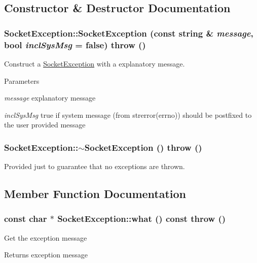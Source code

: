 \subsection{Constructor \& Destructor Documentation}
\hypertarget{classSocketException_abb5bcecd9d9e20868c237ec5a82cf5c3}{
\subsubsection[{SocketException}]{\setlength{\rightskip}{0pt plus 5cm}SocketException::SocketException (const string \& {\em message}, \/  bool {\em inclSysMsg} = {\ttfamily false})  throw ()}}
\label{classSocketException_abb5bcecd9d9e20868c237ec5a82cf5c3}
Construct a \hyperlink{classSocketException}{SocketException} with a explanatory message. 
\begin{DoxyParams}{Parameters}
\item[{\em message}]explanatory message \item[{\em inclSysMsg}]true if system message (from strerror(errno)) should be postfixed to the user provided message \end{DoxyParams}
\hypertarget{classSocketException_a659557c899329aea01977c980c4db9b9}{
\subsubsection[{$\sim$SocketException}]{\setlength{\rightskip}{0pt plus 5cm}SocketException::$\sim$SocketException ()  throw ()}}
\label{classSocketException_a659557c899329aea01977c980c4db9b9}
Provided just to guarantee that no exceptions are thrown. 

\subsection{Member Function Documentation}
\hypertarget{classSocketException_a06b7b3f186976bb5ec7e7bf007c4f0ac}{
\subsubsection[{what}]{\setlength{\rightskip}{0pt plus 5cm}const char $\ast$ SocketException::what () const  throw ()}}
\label{classSocketException_a06b7b3f186976bb5ec7e7bf007c4f0ac}
Get the exception message \begin{DoxyReturn}{Returns}
exception message 
\end{DoxyReturn}



